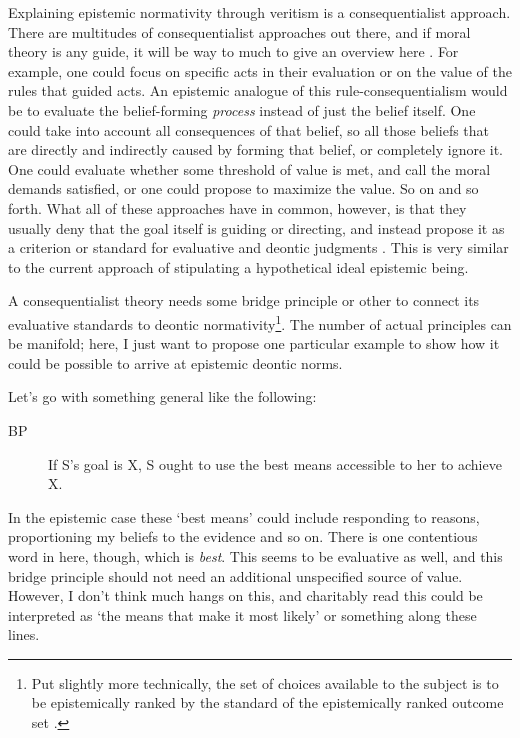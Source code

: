 \documentclass[12pt,numbers=noenddot]{scrartcl}
\begin{document}
Explaining epistemic normativity through veritism is a consequentialist approach. There are multitudes of consequentialist approaches out there, and if moral theory is any guide, it will be way to much to give an overview here \autocite{sep-consequentialism}. For example, one could focus on specific acts in their evaluation or on the value of the rules that guided acts. An epistemic analogue of this rule-consequentialism would be to evaluate the belief-forming \emph{process} instead of just the belief itself. One could take into account all consequences of that belief, so all those beliefs that are directly and indirectly caused by forming that belief, or completely ignore it. One could evaluate whether some threshold of value is met, and call the moral demands satisfied, or one could propose to maximize the value. So on and so forth. What all of these approaches have in common, however, is that they usually deny that the goal itself is guiding or directing, and instead propose it as a criterion or standard for evaluative and deontic judgments \autocite[16]{sep-consequentialism}. This is very similar to the current approach of stipulating a hypothetical ideal epistemic being.

A consequentialist theory needs some bridge principle or other to connect its evaluative standards to deontic normativity\footnote{Put slightly more technically, the set of choices available to the subject is to be epistemically ranked by the standard of the epistemically ranked outcome set \autocite{adler_ranking_2011}.}. The number of actual principles can be manifold; here, I just want to propose one particular example to show how it could be possible to arrive at epistemic deontic norms.

Let's go with something general like the following:

\begin{description}
    \item[BP] If S's goal is X, S ought to use the best means accessible to her to achieve X.
\end{description}

In the epistemic case these ‘best means’ could include responding to reasons, proportioning my beliefs to the evidence and so on. There is one contentious word in here, though, which is \emph{best}. This seems to be evaluative as well, and this bridge principle should not need an additional unspecified source of value. However, I don't think much hangs on this, and charitably read this could be interpreted as ‘the means that make it most likely’ or something along these lines.
\end{document}
